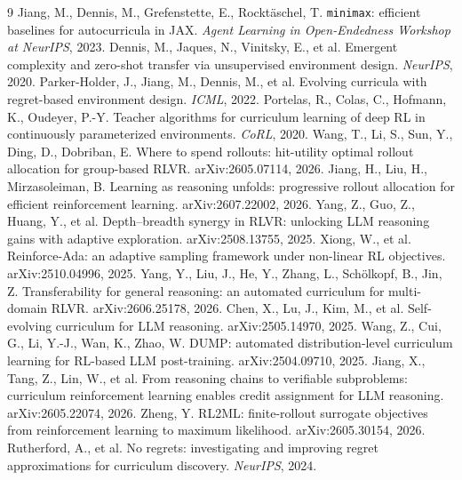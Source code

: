 \begin{thebibliography}{9}
 Jiang, M., Dennis, M.,
Grefenstette, E., Rockt\"{a}schel, T. \texttt{minimax}: efficient baselines
for autocurricula in JAX. \emph{Agent Learning in Open-Endedness Workshop at
NeurIPS}, 2023.
 Dennis, M., Jaques, N., Vinitsky,
E., et al. Emergent complexity and zero-shot transfer via unsupervised
environment design. \emph{NeurIPS}, 2020.
 Parker-Holder, J., Jiang, M.,
Dennis, M., et al. Evolving curricula with regret-based environment design.
\emph{ICML}, 2022.
 Portelas, R., Colas, C.,
Hofmann, K., Oudeyer, P.-Y. Teacher algorithms for curriculum learning
of deep RL in continuously parameterized environments. \emph{CoRL},
2020.
 Wang, T., Li, S., Sun, Y., Ding, D.,
Dobriban, E. Where to spend rollouts: hit-utility optimal rollout
allocation for group-based RLVR. arXiv:2605.07114, 2026.
 Jiang, H., Liu, H.,
Mirzasoleiman, B. Learning as reasoning unfolds: progressive rollout
allocation for efficient reinforcement learning. arXiv:2607.22002,
2026.
 Yang, Z., Guo, Z., Huang, Y., et al.
Depth--breadth synergy in RLVR: unlocking LLM reasoning gains with
adaptive exploration. arXiv:2508.13755, 2025.
 Xiong, W., et al.
Reinforce-Ada: an adaptive sampling framework under non-linear RL
objectives. arXiv:2510.04996, 2025.
 Yang, Y., Liu, J., He, Y., Zhang, L.,
Sch\"olkopf, B., Jin, Z. Transferability for general reasoning: an automated
curriculum for multi-domain RLVR. arXiv:2606.25178, 2026.
 Chen, X., Lu, J., Kim, M., et al.
Self-evolving curriculum for LLM reasoning. arXiv:2505.14970, 2025.
 Wang, Z., Cui, G., Li, Y.-J., Wan, K.,
Zhao, W. DUMP: automated distribution-level curriculum learning for
RL-based LLM post-training. arXiv:2504.09710, 2025.
 Jiang, X., Tang, Z., Lin, W., et al.
From reasoning chains to verifiable subproblems: curriculum reinforcement
learning enables credit assignment for LLM reasoning. arXiv:2605.22074, 2026.
 Zheng, Y. RL2ML: finite-rollout
surrogate objectives from reinforcement learning to maximum
likelihood. arXiv:2605.30154, 2026.
 Rutherford, A., et al. No
regrets: investigating and improving regret approximations for
curriculum discovery. \emph{NeurIPS}, 2024.

\end{thebibliography}
